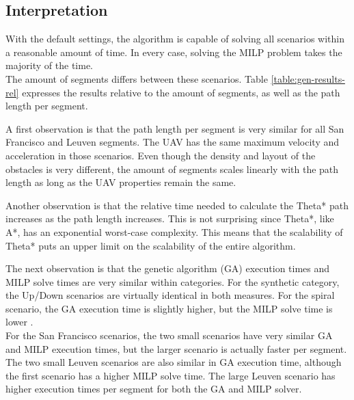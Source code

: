 \subsection{Interpretation}
With the default settings, the algorithm is capable of solving all scenarios within a reasonable amount of time. In every case, solving the MILP problem takes the majority of the time. \\
The amount of segments differs between these scenarios. Table \ref{table:gen-results-rel} expresses the results relative to the amount of segments, as well as the path length per segment.
\par
A first observation is that the path length per segment is very similar for all San Francisco and Leuven segments. The UAV has the same maximum velocity and acceleration in those scenarios. Even though the density and layout of the obstacles is very different, the amount of segments scales linearly with the path length as long as the UAV properties remain the same.
\par
Another observation is that the relative time needed to calculate the Theta* path increases as the path length increases. This is not surprising since Theta*, like A*, has an exponential worst-case complexity. This means that the scalability of Theta* puts an upper limit on the scalability of the entire algorithm.
\par
The next observation is that the genetic algorithm (GA) execution times and MILP solve times are very similar within categories. For the synthetic category, the Up/Down scenarios are virtually identical in both measures. For the spiral scenario, the GA execution time is slightly higher, but the MILP solve time is lower .  \\
For the San Francisco scenarios, the two small scenarios have very similar GA and MILP execution times, but the larger scenario is actually faster per segment. The two small Leuven scenarios are also similar in GA execution time, although the first scenario has a higher MILP solve time. The large Leuven scenario has higher execution times per segment for both the GA and MILP solver.
\par
\newpage
